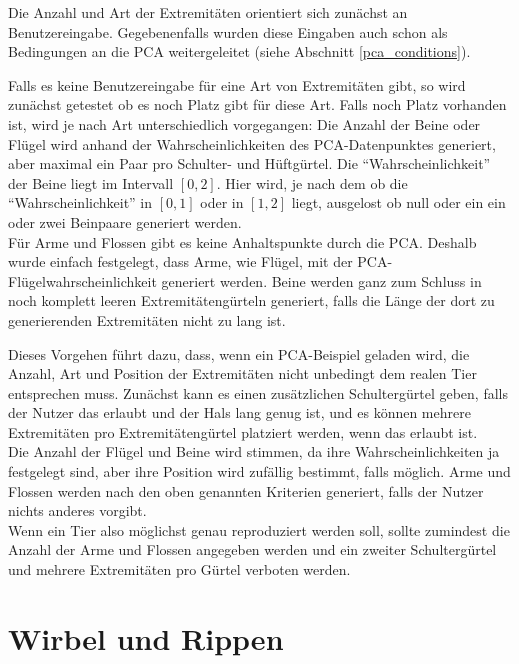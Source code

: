 Die Anzahl und Art der Extremitäten orientiert sich zunächst an Benutzereingabe. Gegebenenfalls wurden diese Eingaben auch schon als Bedingungen an die PCA weitergeleitet (siehe Abschnitt \ref{pca_conditions}).

Falls es keine Benutzereingabe für eine Art von Extremitäten gibt, so wird zunächst getestet ob es noch Platz gibt für diese Art. Falls noch Platz vorhanden ist, wird je nach Art unterschiedlich vorgegangen:
Die Anzahl der Beine oder Flügel wird anhand der Wahrscheinlichkeiten des PCA-Datenpunktes generiert, aber maximal ein Paar pro Schulter- und Hüftgürtel. Die "`Wahrscheinlichkeit"' der Beine liegt im Intervall $[0, 2]$. Hier wird, je nach dem ob die "`Wahrscheinlichkeit"' in $[0, 1]$ oder in $[1, 2]$ liegt, ausgelost ob null oder ein \bzw ein oder zwei Beinpaare generiert werden.\\
Für Arme und Flossen gibt es keine Anhaltspunkte durch die PCA. Deshalb wurde einfach festgelegt, dass Arme, wie Flügel, mit der PCA-Flügelwahrscheinlichkeit generiert werden. Beine werden ganz zum Schluss in noch komplett leeren Extremitätengürteln generiert, falls die Länge der dort zu generierenden Extremitäten nicht zu lang ist.


Dieses Vorgehen führt dazu, dass, wenn ein PCA-Beispiel geladen wird, die Anzahl, Art und Position der Extremitäten nicht unbedingt dem realen Tier entsprechen muss.
Zunächst kann es einen zusätzlichen Schultergürtel geben, falls der Nutzer das erlaubt und der Hals lang genug ist, und es können mehrere Extremitäten pro Extremitätengürtel platziert werden, wenn das erlaubt ist.\\
Die Anzahl der Flügel und Beine wird stimmen, da ihre Wahrscheinlichkeiten ja festgelegt sind, aber ihre Position wird zufällig bestimmt, falls möglich.  Arme und Flossen werden nach den oben genannten Kriterien generiert, falls der Nutzer nichts anderes vorgibt.\\
Wenn ein Tier also möglichst genau reproduziert werden soll, sollte zumindest die Anzahl der Arme und Flossen angegeben werden und ein zweiter Schultergürtel und mehrere Extremitäten pro Gürtel verboten werden.


\section{Wirbel und Rippen}

